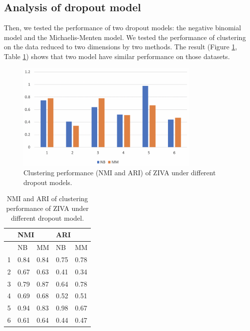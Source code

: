 \subsection{Analysis of dropout model}
Then, we tested the performance of two dropout models: the negative binomial model and the Michaelis-Menten model. We tested the performance of clustering on the data reduced to two dimensions by two methods. The result (Figure \ref{nbmmari}, Table \ref{tnbmm}) shows that two model have similar performance on those datasets.
\begin{figure}[htb!]
    \centering
    \includegraphics[width=0.8\textwidth]{figures/myfigures/nbmmari.png}
    \caption{Clustering performance (NMI and ARI) of ZIVA under different dropout models.}
    \label{nbmmari}
\end{figure}

\begin{table}[htb!]
\centering
\caption{NMI and ARI of clustering performance of ZIVA under different dropout model.}
\label{tnbmm}
\begin{tabular}{lllll}
\hline
  & \multicolumn{2}{l}{NMI} & \multicolumn{2}{l}{ARI} \\ \hline
  & NB         & MM         & NB         & MM         \\ \hline
1 & 0.84       & 0.84       & 0.75       & 0.78       \\
2 & 0.67       & 0.63       & 0.41       & 0.34       \\
3 & 0.79       & 0.87       & 0.64       & 0.78       \\
4 & 0.69       & 0.68       & 0.52       & 0.51       \\
5 & 0.94       & 0.83       & 0.98       & 0.67       \\
6 & 0.61       & 0.64       & 0.44       & 0.47       \\ \hline
\end{tabular}
\end{table}

